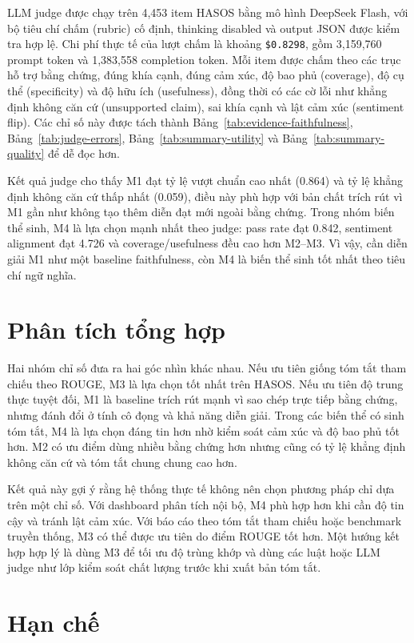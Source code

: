 \documentclass[12pt,a4paper]{report}
\begin{document}
LLM judge được chạy trên 4,453 item HASOS bằng mô hình DeepSeek Flash, với bộ tiêu chí chấm (rubric) cố định, thinking disabled và output JSON được kiểm tra hợp lệ. Chi phí thực tế của lượt chấm là khoảng \texttt{\$0.8298}, gồm 3,159,760 prompt token và 1,383,558 completion token. Mỗi item được chấm theo các trục hỗ trợ bằng chứng, đúng khía cạnh, đúng cảm xúc, độ bao phủ (coverage), độ cụ thể (specificity) và độ hữu ích (usefulness), đồng thời có các cờ lỗi như khẳng định không căn cứ (unsupported claim), sai khía cạnh và lật cảm xúc (sentiment flip). Các chỉ số này được tách thành Bảng~\ref{tab:evidence-faithfulness}, Bảng~\ref{tab:judge-errors}, Bảng~\ref{tab:summary-utility} và Bảng~\ref{tab:summary-quality} để dễ đọc hơn.

Kết quả judge cho thấy M1 đạt tỷ lệ vượt chuẩn cao nhất (0.864) và tỷ lệ khẳng định không căn cứ thấp nhất (0.059), điều này phù hợp với bản chất trích rút vì M1 gần như không tạo thêm diễn đạt mới ngoài bằng chứng. Trong nhóm biến thể sinh, M4 là lựa chọn mạnh nhất theo judge: pass rate đạt 0.842, sentiment alignment đạt 4.726 và coverage/usefulness đều cao hơn M2--M3. Vì vậy, cần diễn giải M1 như một baseline faithfulness, còn M4 là biến thể sinh tốt nhất theo tiêu chí ngữ nghĩa.

\section{Phân tích tổng hợp}

Hai nhóm chỉ số đưa ra hai góc nhìn khác nhau. Nếu ưu tiên giống tóm tắt tham chiếu theo ROUGE, M3 là lựa chọn tốt nhất trên HASOS. Nếu ưu tiên độ trung thực tuyệt đối, M1 là baseline trích rút mạnh vì sao chép trực tiếp bằng chứng, nhưng đánh đổi ở tính cô đọng và khả năng diễn giải. Trong các biến thể có sinh tóm tắt, M4 là lựa chọn đáng tin hơn nhờ kiểm soát cảm xúc và độ bao phủ tốt hơn. M2 có ưu điểm dùng nhiều bằng chứng hơn nhưng cũng có tỷ lệ khẳng định không căn cứ và tóm tắt chung chung cao hơn.

Kết quả này gợi ý rằng hệ thống thực tế không nên chọn phương pháp chỉ dựa trên một chỉ số. Với dashboard phân tích nội bộ, M4 phù hợp hơn khi cần độ tin cậy và tránh lật cảm xúc. Với báo cáo theo tóm tắt tham chiếu hoặc benchmark truyền thống, M3 có thể được ưu tiên do điểm ROUGE tốt hơn. Một hướng kết hợp hợp lý là dùng M3 để tối ưu độ trùng khớp và dùng các luật hoặc LLM judge như lớp kiểm soát chất lượng trước khi xuất bản tóm tắt.

\section{Hạn chế}
\end{document}
